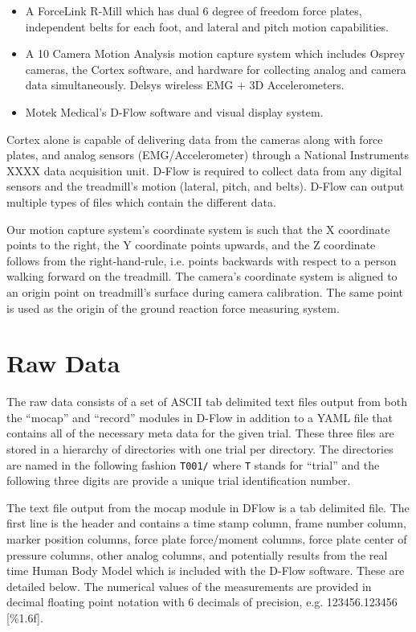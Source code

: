 \documentclass{article}
\begin{document}
\begin{itemize}
  \item A ForceLink R-Mill which has dual 6 degree of freedom force plates,
    independent belts for each foot, and lateral and pitch motion capabilities.
  \item A 10 Camera Motion Analysis motion capture system which includes Osprey
    cameras, the Cortex software, and hardware for collecting analog and camera
    data simultaneously. Delsys wireless EMG + 3D Accelerometers.
  \item Motek Medical’s D-Flow software and visual display system.
\end{itemize}

Cortex alone is capable of delivering data from the cameras along with force
plates, and analog sensors (EMG/Accelerometer) through a National Instruments
XXXX data acquisition unit. D-Flow is required to collect data from any digital
sensors and the treadmill's motion (lateral, pitch, and belts). D-Flow can
output multiple types of files which contain the different data.

Our motion capture system's coordinate system is such that the X coordinate
points to the right, the Y coordinate points upwards, and the Z coordinate
follows from the right-hand-rule, i.e. points backwards with respect to a
person walking forward on the treadmill. The camera's coordinate system is
aligned to an origin point on treadmill's surface during camera calibration.
The same point is used as the origin of the ground reaction force measuring
system.

\section{Raw Data}
%
The raw data consists of a set of ASCII tab delimited text files output from
both the ``mocap'' and ``record'' modules in D-Flow in addition to a YAML file
that contains all of the necessary meta data for the given trial. These three
files are stored in a hierarchy of directories with one trial per directory.
The directories are named in the following fashion \verb+T001/+ where \verb+T+
stands for ``trial'' and the following three digits are provide a unique trial
identification number.

The text file output from the mocap module in DFlow is a tab delimited file.
The first line is the header and contains a time stamp column, frame number
column, marker position columns, force plate force/moment columns, force plate
center of pressure columns, other analog columns, and potentially results from
the real time Human Body Model \cite{Bogert2013} which is included with the
D-Flow software. These are detailed below. The numerical values of the
measurements are provided in decimal floating point notation with 6 decimals of
precision, e.g. 123456.123456 [\%1.6f].
\end{document}
